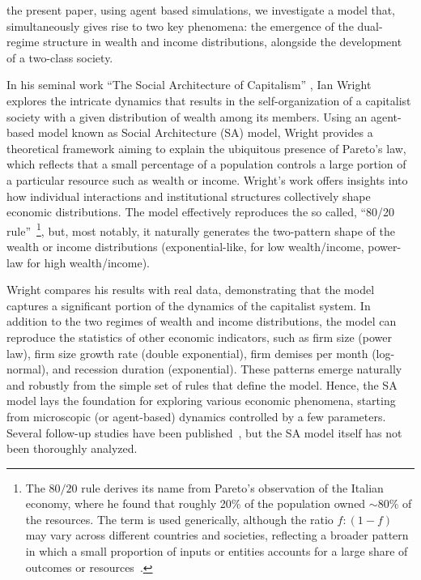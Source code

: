 the present paper, using agent based simulations, we investigate a model that, simultaneously gives rise to two key phenomena: the emergence of the dual-regime structure in wealth and income distributions, alongside the development of a two-class society.

In his seminal work ``The Social Architecture of Capitalism'' \cite{Wright_2005}, Ian Wright explores the intricate dynamics that results in the self-organization of a capitalist society with a given distribution of wealth among its members. Using an agent-based model known as Social Architecture (SA) model, Wright provides a theoretical framework aiming to explain the ubiquitous presence of Pareto's law, which reflects that a small percentage of a population controls a large portion of a particular resource such as wealth or income. Wright's work offers insights into how individual interactions and institutional structures collectively shape economic distributions. The model effectively reproduces the so called, ``80/20 rule''~\footnote{The $80/20$ rule derives its name from Pareto's observation of the Italian economy, where he found that roughly 20\% of the population owned $\sim80$\% of the resources. The term is used generically, although the ratio $f:(1-f)$ may vary across different countries and societies, reflecting a broader pattern in which a small proportion of inputs or entities accounts for a large share of outcomes or resources~\cite{boghosian2014,boghosian2014a}.}, but, most notably, it naturally generates the two-pattern shape of the wealth or income distributions (exponential-like, for low wealth/income, power-law for high wealth/income).

Wright compares his results with real data, demonstrating that the model captures a significant portion of the dynamics of the capitalist system. In addition to the two regimes of wealth and income distributions, the model can reproduce the statistics of other economic indicators, such as firm size (power law), firm size growth rate (double exponential), firm demises per month (log-normal), and recession duration (exponential). These patterns emerge naturally and robustly from the simple set of rules that define the model. Hence, the SA model lays the foundation for exploring various economic phenomena, starting from microscopic (or agent-based) dynamics controlled by a few parameters. Several follow-up studies have been published~\cite{cockshott2012classical,wright2008implicit,LAVICKA2010,ISAAC2019,VILLA2022,MAX2024}, but the SA model itself has not been thoroughly analyzed.

